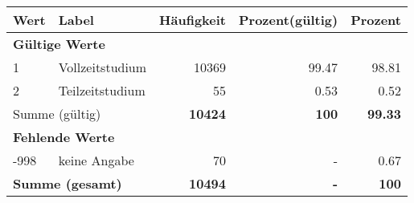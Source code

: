      \begin{longtable}{lXrrr}
     \toprule
     \textbf{Wert} & \textbf{Label} & \textbf{Häufigkeit} & \textbf{Prozent(gültig)} & \textbf{Prozent} \\
     \endhead
     \midrule
     \multicolumn{5}{l}{\textbf{Gültige Werte}}\\

     1 &
     \multicolumn{1}{X}{ Vollzeitstudium   } &


       \num{10369} &
       \num[round-mode=places,round-precision=2]{99.47} &
         \num[round-mode=places,round-precision=2]{98.81} \\

     2 &
     \multicolumn{1}{X}{ Teilzeitstudium   } &


       \num{55} &
       \num[round-mode=places,round-precision=2]{0.53} &
         \num[round-mode=places,round-precision=2]{0.52} \\
     \midrule
     \multicolumn{2}{l}{Summe (gültig)} &
       \textbf{\num{10424}} &
     \textbf{\num{100}} &
       \textbf{\num[round-mode=places,round-precision=2]{99.33}} \\
     \multicolumn{5}{l}{\textbf{Fehlende Werte}}\\
       -998 &
       keine Angabe &
         \num{70} &
        - &
         \num[round-mode=places,round-precision=2]{0.67} \\
     \midrule
     \multicolumn{2}{l}{\textbf{Summe (gesamt)}} &
          \textbf{\num{10494}} &
        \textbf{-} &
        \textbf{\num{100}} \\
     \bottomrule
     \end{longtable}
     
